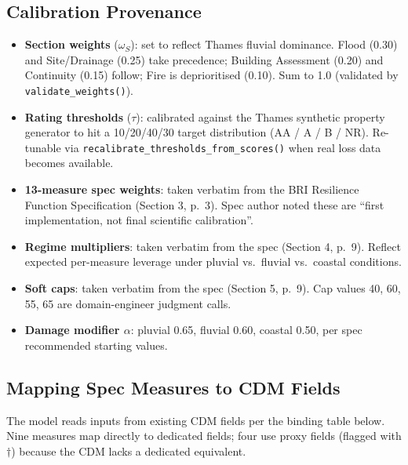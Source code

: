 \documentclass[11pt,a4paper]{article}
\begin{document}
\subsection{Calibration Provenance}
\begin{itemize}[nosep]
    \item \textbf{Section weights} ($\omega_S$): set to reflect Thames fluvial
          dominance. Flood (0.30) and Site/Drainage (0.25) take precedence; Building
          Assessment (0.20) and Continuity (0.15) follow; Fire is deprioritised (0.10).
          Sum to 1.0 (validated by \texttt{validate\_weights()}).
    \item \textbf{Rating thresholds} ($\tau$): calibrated against the Thames synthetic
          property generator to hit a 10/20/40/30 target distribution
          (AA / A / B / NR). Re-tunable via \texttt{recalibrate\_thresholds\_from\_scores()}
          when real loss data becomes available.
    \item \textbf{13-measure spec weights}: taken verbatim from the BRI Resilience
          Function Specification (Section 3, p.\ 3). Spec author noted these are
          ``first implementation, not final scientific calibration''.
    \item \textbf{Regime multipliers}: taken verbatim from the spec (Section 4, p.\ 9).
          Reflect expected per-measure leverage under pluvial vs.\ fluvial vs.\
          coastal conditions.
    \item \textbf{Soft caps}: taken verbatim from the spec (Section 5, p.\ 9). Cap
          values 40, 60, 55, 65 are domain-engineer judgment calls.
    \item \textbf{Damage modifier $\alpha$}: pluvial 0.65, fluvial 0.60, coastal 0.50,
          per spec recommended starting values.
\end{itemize}

\subsection{Mapping Spec Measures to CDM Fields}
The model reads inputs from existing CDM fields per the binding table below. Nine
measures map directly to dedicated fields; four use proxy fields (flagged with
$\dagger$) because the CDM lacks a dedicated equivalent.
\end{document}
